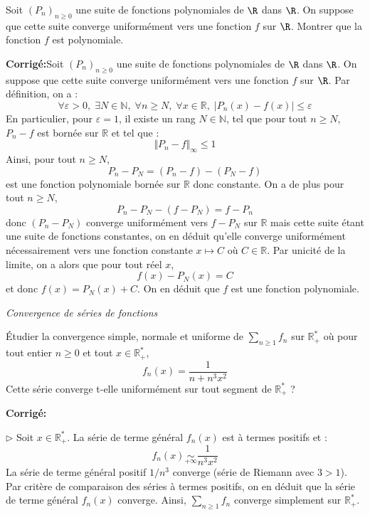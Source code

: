 \documentclass[a4paper,twoside,french,11pt]{VcCours}
\newcommand{\Sum}[2]{\sum_{#1}^{#2}}
\newcommand{\corr}{\textbf{Corrigé:}}
\begin{document}
\medskip


\begin{Exercice}{} Soit $(P_{n})_{n \geq 0}$ une suite de fonctions polynomiales de $\R$ dans $\R$. On suppose que cette suite converge uniformément vers une fonction $f$ sur $\R$. Montrer que la fonction $f$ est polynomiale.
\end{Exercice}

\corr Soit $(P_{n})_{n \geq 0}$ une suite de fonctions polynomiales de $\R$ dans $\R$. On suppose que cette suite converge uniformément vers une fonction $f$ sur $\R$. Par définition, on a :
$$ \forall \varepsilon >0, \; \exists N \in \mathbb{N}, \; \forall n \geq N, \;  \forall x \in \mathbb{R}, \; \vert P_n(x)-f(x) \vert \leq \varepsilon$$
En particulier, pour $\varepsilon=1$, il existe un rang $N \in \mathbb{N}$, tel que pour tout $n \geq N$, $P_n-f$ est bornée sur $\mathbb{R}$ et tel que :
$$ \Vert P_n- f \Vert_{\infty} \leq 1$$
Ainsi, pour tout $n \geq N$,
$$ P_n-P_N = (P_n-f)-(P_N-f)$$
est une fonction polynomiale bornée sur $\mathbb{R}$ donc constante. On a de plus pour tout $n \geq N$,
$$ P_n-P_N - (f-P_N) = f-P_n$$
donc $(P_n-P_N)$ converge uniformément vers $f-P_N$ sur $\mathbb{R}$ mais cette suite étant une suite de fonctions constantes, on en déduit qu'elle converge uniformément nécessairement vers une fonction constante $x \mapsto C$ où $C \in \mathbb{R}$. Par unicité de la limite, on a alors que pour tout réel $x$,
$$ f(x)-P_N(x)=C$$
et donc $f(x)=P_N(x)+C$. On en déduit que $f$ est une fonction polynomiale.

\medskip

\begin{center}
\textit{{ {\large Convergence de séries de fonctions}}}
\end{center}

\medskip

\begin{Exercice}{} Étudier la convergence simple, normale et uniforme de $\Sum{n\geq 1}{} f_n$ sur $\mathbb{R}_+^*$ où pour tout entier $n \geq 0$ et tout $x \in \mathbb{R}_+^*$, 
$$ f_n(x) = \frac{1}{n+n^3x^2}$$
Cette série converge t-elle uniformément sur tout segment de $\mathbb{R}_+^*$ ?
\end{Exercice} 

\corr 

$\rhd$ Soit $x \in \mathbb{R}_+^*$. La série de terme général $f_n(x)$ est à termes positifs et :
$$ f_n(x) \underset{+ \infty}{\sim} \dfrac{1}{n^3x^2}$$
La série de terme général positif $1/n^3$ converge (série de Riemann avec $3>1$). Par critère de comparaison des séries à termes positifs, on en déduit que la série de terme général $f_n(x)$ converge. Ainsi, $\Sum{n\geq 1}{} f_n$ converge simplement sur $\mathbb{R}_+^*$.
\end{document}
